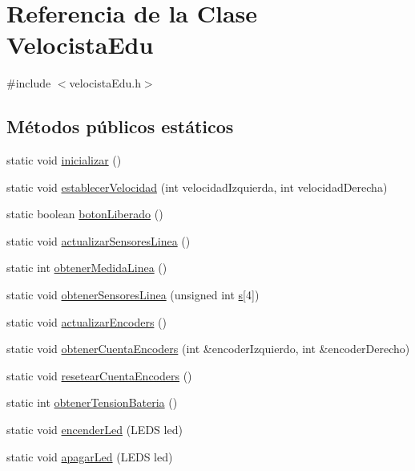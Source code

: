 \hypertarget{classVelocistaEdu}{\section{Referencia de la Clase Velocista\-Edu}
\label{classVelocistaEdu}
}


{\ttfamily \#include $<$velocista\-Edu.\-h$>$}

\subsection*{Métodos públicos estáticos}
\begin{DoxyCompactItemize}
\item 
static void \hyperlink{classVelocistaEdu_a25cef84df3fb113c7605ef584acc4791}{inicializar} ()
\item 
static void \hyperlink{classVelocistaEdu_a310d6308d71269f0ab368df057bed863}{establecer\-Velocidad} (int velocidad\-Izquierda, int velocidad\-Derecha)
\item 
static boolean \hyperlink{classVelocistaEdu_ac7a4e6998613c3a4bc6932ac36cbabd5}{boton\-Liberado} ()
\item 
static void \hyperlink{classVelocistaEdu_ac8cc7494181803a62e6c018688360af2}{actualizar\-Sensores\-Linea} ()
\item 
static int \hyperlink{classVelocistaEdu_a917c5a5db3464f24ff0f1d088db20c1f}{obtener\-Medida\-Linea} ()
\item 
static void \hyperlink{classVelocistaEdu_a584073fb623a16c9286c20273431d27a}{obtener\-Sensores\-Linea} (unsigned int \hyperlink{classVelocistaEdu_ae3107ce76e04c78e7294bef7c14c544a}{s}\mbox{[}4\mbox{]})
\item 
static void \hyperlink{classVelocistaEdu_a2a8437ea728a209140eff908bdcd2ae0}{actualizar\-Encoders} ()
\item 
static void \hyperlink{classVelocistaEdu_aed23e7a0cc9fcbcaa09edcef6bd76a76}{obtener\-Cuenta\-Encoders} (int \&encoder\-Izquierdo, int \&encoder\-Derecho)
\item 
static void \hyperlink{classVelocistaEdu_a61d5fd4eafd7353e0de1cc404e52287e}{resetear\-Cuenta\-Encoders} ()
\item 
static int \hyperlink{classVelocistaEdu_a903ad991b6ed5e9f92e92ee03ae9a73d}{obtener\-Tension\-Bateria} ()
\item 
static void \hyperlink{classVelocistaEdu_a7b51e9c36a2f5d57e763904b38c79e3d}{encender\-Led} (L\-E\-D\-S led)
\item 
static void \hyperlink{classVelocistaEdu_a00c86220166c03bc3066bd6d1368c6b1}{apagar\-Led} (L\-E\-D\-S led)
\end{DoxyCompactItemize}
